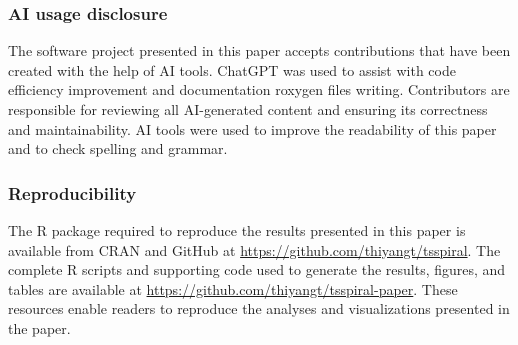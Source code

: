 \documentclass[
  12pt,
  a4paper,
]{article}
\begin{document}
\subsubsection*{AI usage disclosure}\label{ai-usage-disclosure}

The software project presented in this paper accepts contributions that
have been created with the help of AI tools. ChatGPT was used to assist
with code efficiency improvement and documentation roxygen files
writing. Contributors are responsible for reviewing all AI-generated
content and ensuring its correctness and maintainability. AI tools were
used to improve the readability of this paper and to check spelling and
grammar.

\subsubsection*{Reproducibility}\label{reproducibility}

The R package required to reproduce the results presented in this paper
is available from CRAN and GitHub at
\url{https://github.com/thiyangt/tsspiral}. The complete R scripts and
supporting code used to generate the results, figures, and tables are
available at \url{https://github.com/thiyangt/tsspiral-paper}. These
resources enable readers to reproduce the analyses and visualizations
presented in the paper.


\printbibliography[title=References]
\end{document}
